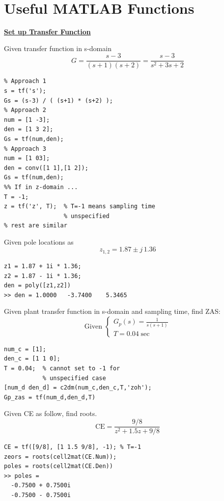 \clearpage
\section{Useful MATLAB Functions}

\underline{\textbf{Set up Transfer Function}}

Given transfer function in s-domain
    \begin{equation*}
        G = \frac{s-3}{(s+1)(s+2)} = \frac{s-3}{s^2+3s+2}
    \end{equation*}

\begin{lstlisting}
% Approach 1
s = tf('s');
Gs = (s-3) / ( (s+1) * (s+2) );
% Approach 2
num = [1 -3];
den = [1 3 2];
Gs = tf(num,den);
% Approach 3
num = [1 03];
den = conv([1 1],[1 2]);
Gs = tf(num,den);
%% If in z-domain ...
T = -1;
z = tf('z', T);  % T=-1 means sampling time
                 % unspecified
% rest are similar
\end{lstlisting}

Given pole locations as
\begin{equation*}
    z_{1,2} = 1.87 \pm j\, 1.36
\end{equation*}

\begin{lstlisting}
z1 = 1.87 + 1i * 1.36; 
z2 = 1.87 - 1i * 1.36;
den = poly([z1,z2])
>> den = 1.0000   -3.7400    5.3465
\end{lstlisting}

Given plant transfer function in s-domain and sampling time, find ZAS:
\begin{equation*}
    \text{Given } \begin{cases}
    G_p(s) = \frac{1}{s(s+1)} \\
    T = 0.04 \; \text{sec}
    \end{cases}
\end{equation*}
\begin{lstlisting}
num_c = [1];
den_c = [1 1 0];
T = 0.04;  % cannot set to -1 for 
           % unspecified case
[num_d den_d] = c2dm(num_c,den_c,T,'zoh');
Gp_zas = tf(num_d,den_d,T)
\end{lstlisting}

Given CE as follow, find roots.
\begin{equation*}
    \text{CE} = \frac{9/8}{z^2+1.5z+9/8}
\end{equation*}
\begin{lstlisting}
CE = tf([9/8], [1 1.5 9/8], -1); % T=-1
zeors = roots(cell2mat(CE.Num));
poles = roots(cell2mat(CE.Den))
>> poles =
  -0.7500 + 0.7500i
  -0.7500 - 0.7500i
\end{lstlisting}




